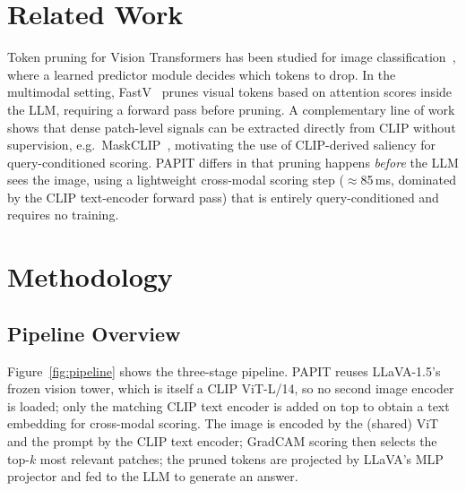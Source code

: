 \documentclass[10pt,twocolumn,letterpaper]{article}
\begin{document}
\section{Related Work}

Token pruning for Vision Transformers has been studied for image
classification~\cite{rao2021dynamicvit, meng2022adavit}, where a learned
predictor module decides which tokens to drop.
In the multimodal setting, FastV~\cite{chen2024fastv} prunes visual tokens
based on attention scores inside the LLM, requiring a forward pass before
pruning.
A complementary line of work shows that dense patch-level signals can be
extracted directly from CLIP without supervision, e.g.\ MaskCLIP~\cite{zhou2022maskclip},
motivating the use of CLIP-derived saliency for query-conditioned scoring.
PAPIT differs in that pruning happens \emph{before} the LLM sees the image,
using a lightweight cross-modal scoring step ($\approx$85\,ms, dominated by
the CLIP text-encoder forward pass) that is entirely query-conditioned and
requires no training.

\section{Methodology}
\label{sec:method}

\subsection{Pipeline Overview}

Figure~\ref{fig:pipeline} shows the three-stage pipeline.
PAPIT reuses LLaVA-1.5's frozen vision tower, which is itself a CLIP
ViT-L/14, so no second image encoder is loaded; only the matching CLIP
text encoder is added on top to obtain a text embedding for cross-modal
scoring.
The image is encoded by the (shared) ViT and the prompt by the CLIP text
encoder; GradCAM scoring then selects the top-$k$ most relevant patches;
the pruned tokens are projected by LLaVA's MLP projector and fed to the
LLM to generate an answer.
\end{document}
